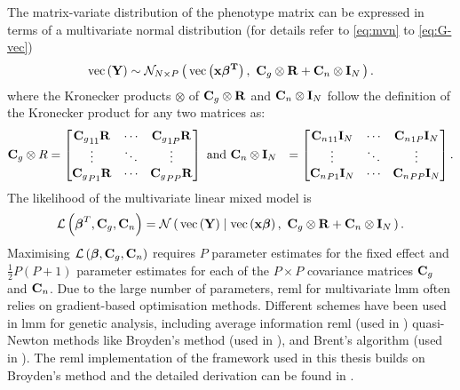 % 
The matrix-variate distribution of the phenotype matrix  can be expressed in terms of a multivariate normal distribution (for details refer to \cref{eq:mvn} to \cref{eq:G-vec})
%
\begin{equation}
\text{vec}\left(\boldsymbol{\mathbf{Y}}\right) \sim \mathcal{N}_{N\times P}\left(\, {\text{vec}\left(\boldsymbol{\mathbf{x}}\boldsymbol{\mathbf{\beta^T}}\right)} \,,~{\boldsymbol{\mathbf{C}}_g \otimes \boldsymbol{\mathbf{R}} + \boldsymbol{\mathbf{C}}_n \otimes\boldsymbol{\mathbf{I}}_N} \,\right).
\label{eq:lmm-mv-multin}
\end{equation}
%
where the Kronecker products \(\otimes\) of \(\boldsymbol{\mathbf{C}}_g \otimes \boldsymbol{\mathbf{R}}\) and \(\boldsymbol{\mathbf{C}}_n \otimes\boldsymbol{\mathbf{I}}_N\)  follow the definition of the Kronecker product for any two matrices as:
\begin{align*}
 \boldsymbol{\mathbf{C}}_g \otimes R &=
  \begin{bmatrix}
  {\boldsymbol{\mathbf{C}}_g}_{11}\boldsymbol{\mathbf{R}}  &  \cdots &  {\boldsymbol{\mathbf{C}}_g}_{1P}\boldsymbol{\mathbf{R}}  \\
   \vdots &  \ddots & \vdots \\
  {\boldsymbol{\mathbf{C}}_g}_{P1}\boldsymbol{\mathbf{R}}  &  \cdots &  {\boldsymbol{\mathbf{C}}_g}_{PP}\boldsymbol{\mathbf{R}}  \\
   \end{bmatrix} \text{ and }
    \boldsymbol{\mathbf{C}}_n \otimes  \boldsymbol{\mathbf{I}}_N&=
  \begin{bmatrix}
  {\boldsymbol{\mathbf{C}}_n}_{11}\boldsymbol{\mathbf{I}}_N &  \cdots &  {\boldsymbol{\mathbf{C}}_n}_{1P}\boldsymbol{\mathbf{I}}_N  \\
   \vdots &  \ddots & \vdots \\
  {\boldsymbol{\mathbf{C}}_n}_{P1}\boldsymbol{\mathbf{I}}_N  &  \cdots &  {\boldsymbol{\mathbf{C}}_n}_{PP}\boldsymbol{\mathbf{I}}_N  \\
   \end{bmatrix}.
\end{align*}
%
The likelihood of the multivariate linear mixed model is
%
\begin{equation}
\mathcal{L}\left(\boldsymbol{\mathbf{\beta}}^T, \boldsymbol{\mathbf{C}}_g, \boldsymbol{\mathbf{C}}_n\right) = \mathcal{N}\left(\,{\text{vec}\left(\boldsymbol{\mathbf{Y}}\right) \mid \text{vec}\left(\boldsymbol{\mathbf{x}}\boldsymbol{\mathbf{\beta}}\right)}\,,~{\boldsymbol{\mathbf{C}}_g \otimes\boldsymbol{\mathbf{R}} + \boldsymbol{\mathbf{C}}_n \otimes\boldsymbol{\mathbf{I}}_N}\,\right).
\label{eq:lmm-mv-likelihood}
\end{equation}
%
Maximising \(\mathcal{L}\left(\boldsymbol{\mathbf{\beta}}, \boldsymbol{\mathbf{C}}_g, \boldsymbol{\mathbf{C}}_n\right)\) requires \(P\) parameter estimates for the fixed effect \tmat{\beta} and \(\frac{1}{2}P \left( P + 1\right)\) parameter estimates for each of the \(P \times P\) covariance matrices \(\boldsymbol{\mathbf{C}}_g\) and  \(\boldsymbol{\mathbf{C}}_n\). Due to the large number of parameters, \gls{reml} for multivariate \gls{lmm} often relies on gradient-based optimisation methods. Different schemes have been used in \gls{lmm} for genetic analysis, including average information \gls{reml} \citep{Gilmour1995} (used in \citep{Yang2011}) quasi-Newton methods like Broyden's method \citep{Broyden1965} (used in \citep{Casale2015}), and Brent's algorithm \citep{Brent1971} (used in \citep{Lippert2011,Svishcheva2012}). The \gls{reml} implementation of the framework used in this thesis builds on Broyden's method and the detailed derivation can be found in \citep[Supplementary material]{Casale2015}.


